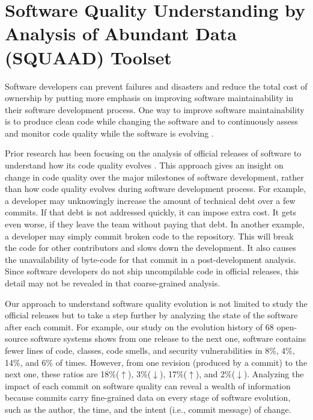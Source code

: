 \section{Software Quality Understanding by Analysis of Abundant Data (SQUAAD) Toolset}
\label{sec:squaad}

Software developers can prevent failures and disasters and reduce the total cost of ownership by putting more emphasis on improving software maintainability in their software development process.
One way to improve software maintainability is to produce clean code while changing the software and to continuously assess and monitor code quality while the software is evolving \cite {mexim2015introduction}.

Prior research has been focusing on the analysis of official releases of software to understand how its code quality evolves \cite{PINTO201559,tu2000evolution,ganpati2012comparative,d2008analysing,le2015empirical}.
This approach gives an insight on change in code quality over the major milestones of software development, rather than how code quality evolves during software development process. 
For example, a developer may unknowingly increase the amount of technical debt over a few commits. If that debt is not addressed quickly, it can impose extra cost.
It gets even worse, if they leave the team without paying that debt.
In another example, a developer may simply commit broken code to the repository.
This will break the code for other contributors and slows down the development.
It also causes the unavailability of byte-code for that commit in a post-development analysis.
Since software developers do not ship uncompilable code in official releases, this detail may not be revealed in that coarse-grained analysis. 

Our approach to understand software quality evolution is not limited to study the official releases but to take a step further by analyzing the state of the software after each commit.
For example, our study on the evolution history of  68 open-source software systems shows from one release to the next one, software contains fewer lines of code, classes, code smells, and security vulnerabilities in 8\%, 4\%, 14\%, and 6\% of times.
However, from one revision (produced by a commit) to the next one, these ratios are 18\%($\uparrow$), 3\%($\downarrow$), 17\%($\uparrow$), and 2\%($\downarrow$).
Analyzing the impact of each commit on software quality can reveal a wealth of information because commits carry fine-grained data on every stage of software evolution, such as the author, the time, and the intent (i.e., commit message) of change.


